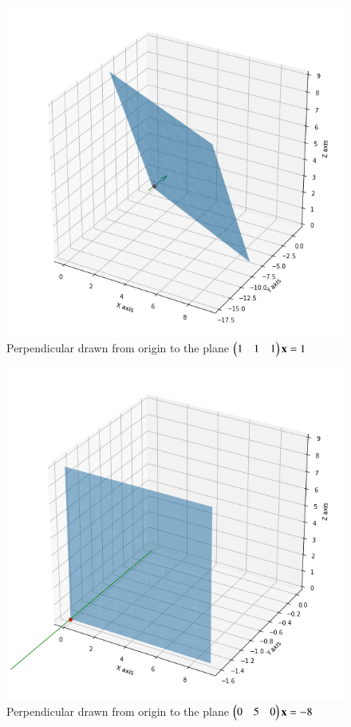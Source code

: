 \documentclass[journal,12pt,twocolumn]{IEEEtran}
\begin{document}
\renewcommand{\thefigure}{c}
\begin{figure}[h!]
    \centering
    \includegraphics[width=\columnwidth]{plane3.png}
    \caption{Perpendicular drawn from origin to the plane $\begin{pmatrix}1&1&1\end{pmatrix}\mathbf{x} = 1$}
    \label{myfig3}
\end{figure}
\renewcommand{\thefigure}{d}
\begin{figure}[h!]
    \centering
    \includegraphics[width=\columnwidth]{plane4.png}
    \caption{Perpendicular drawn from origin to the plane $\begin{pmatrix}0&5&0\end{pmatrix}\mathbf{x} = -8$}
    \label{myfig4}
\end{figure}
\end{document}
